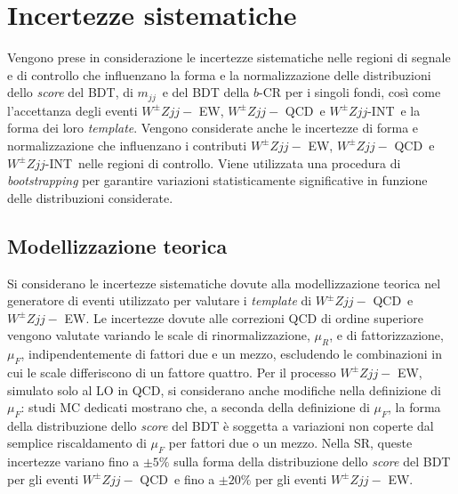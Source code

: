 \documentclass[11pt]{article}
\newcommand{\wzjjew}{$W^\pm Z jj-$ EW}
\newcommand{\wzjjqcd}{$W^\pm Z jj-$ QCD}
\newcommand{\wzjj}{$W^\pm Z jj$}
\newcommand{\mjj}{\ensuremath{m_{jj}}}
\begin{document}
\section{Incertezze sistematiche}
\label{sec:systematics}

Vengono prese in considerazione le incertezze sistematiche nelle regioni di segnale e di controllo che influenzano la forma e la normalizzazione delle distribuzioni dello \textit{score} del BDT, di \mjj\ e del BDT della $b$-CR per i singoli fondi, così come l'accettanza degli eventi \wzjjew, \wzjjqcd\ e \wzjj-INT\ e la forma dei loro \textit{template}. Vengono considerate anche le incertezze di forma e normalizzazione che influenzano i contributi \wzjjew, \wzjjqcd\ e \wzjj-INT\ nelle regioni di controllo. Viene utilizzata una procedura di \textit{bootstrapping} per garantire variazioni statisticamente significative in funzione delle distribuzioni considerate.

\subsection{Modellizzazione teorica}
Si considerano le incertezze sistematiche dovute alla modellizzazione teorica nel generatore di eventi utilizzato per valutare i \textit{template} di \wzjjqcd\ e \wzjjew. Le incertezze dovute alle correzioni QCD di ordine superiore vengono valutate variando le scale di rinormalizzazione, $\mu_R$, e di fattorizzazione, $\mu_F$, indipendentemente di fattori due e un mezzo, escludendo le combinazioni in cui le scale differiscono di un fattore quattro. Per il processo \wzjjew, simulato solo al LO in QCD, si considerano anche modifiche nella definizione di $\mu_F$: studi MC dedicati mostrano che, a seconda della definizione di $\mu_F$, la forma della distribuzione dello \textit{score} del BDT è soggetta a variazioni non coperte dal semplice riscaldamento di $\mu_F$ per fattori due o un mezzo. Nella SR, queste incertezze variano fino a $\pm 5\%$ sulla forma della distribuzione dello \textit{score} del BDT per gli eventi \wzjjqcd\ e fino a $\pm 20\%$ per gli eventi \wzjjew. 
\end{document}
